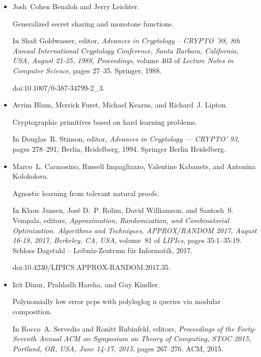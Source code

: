 \documentclass[10pt,a4paper]{article}
\begin{document}
\begin{itemize}
\item[] 
[5]

Josh Cohen Benaloh and Jerry Leichter.


Generalized secret sharing and monotone functions.


In Shafi Goldwasser, editor, \emph{Advances in Cryptology – CRYPTO
’88, 8th Annual International Cryptology Conference, Santa Barbara,
California, USA, August 21-25, 1988, Proceedings}, volume 403 of \emph{Lecture
Notes in Computer Science}, pages 27–35. Springer, 1988.


doi:10.1007/0-387-34799-2\_3.





\item[] 
[6]

Avrim Blum, Merrick Furst, Michael Kearns, and Richard J. Lipton.


Cryptographic primitives based on hard learning problems.


In Douglas R. Stinson, editor, \emph{Advances in Cryptology —
CRYPTO’ 93}, pages 278–291, Berlin, Heidelberg, 1994. Springer Berlin
Heidelberg.





\item[] 
[7]

Marco L. Carmosino, Russell Impagliazzo, Valentine Kabanets, and Antonina
Kolokolova.


Agnostic learning from tolerant natural proofs.


In Klaus Jansen, José D. P. Rolim, David Williamson, and
Santosh S. Vempala, editors, \emph{Approximation, Randomization, and
Combinatorial Optimization. Algorithms and Techniques, APPROX/RANDOM 2017,
August 16-18, 2017, Berkeley, CA, USA}, volume 81 of \emph{LIPIcs}, pages
35:1–35:19. Schloss Dagstuhl – Leibniz-Zentrum für Informatik, 2017.


doi:10.4230/LIPICS.APPROX-RANDOM.2017.35.





\item[] 
[8]

Irit Dinur, Prahladh Harsha, and Guy Kindler.


Polynomially low error pcps with polyloglog n queries via modular
composition.


In Rocco A. Servedio and Ronitt Rubinfeld, editors, \emph{Proceedings
of the Forty-Seventh Annual ACM on Symposium on Theory of Computing, STOC
2015, Portland, OR, USA, June 14-17, 2015}, pages 267–276. ACM, 2015.



\end{itemize}
\end{document}
